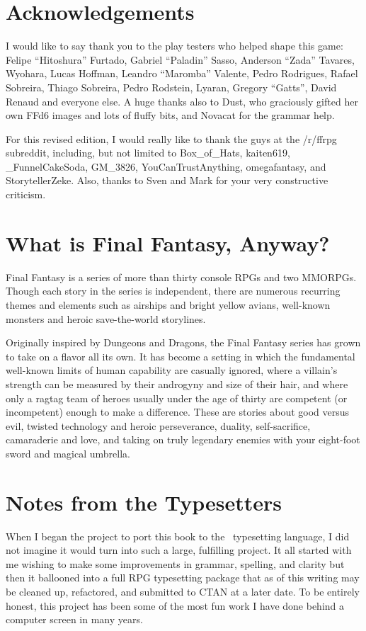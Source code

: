 \begin{multicols}{2}
\section{Acknowledgements}\label{sec:acknowledgements}
I would like to say thank you to the play testers who helped shape this game: Felipe ``Hitoshura'' Furtado, Gabriel ``Paladin'' Sasso, Anderson ``Zada'' Tavares, Wyohara, Lucas Hoffman, Leandro ``Maromba'' Valente, Pedro Rodrigues, Rafael Sobreira, Thiago Sobreira, Pedro Rodstein, Lyaran, Gregory ``Gatts'', David Renaud and everyone else. A huge thanks also to Dust, who graciously gifted her own FFd6 images and lots of fluffy bits, and Novacat for the grammar
help. \pw%

For this revised edition, I would really like to thank the guys at the /r/ffrpg subreddit, including, but not limited to Box\_of\_Hats, kaiten619, \_FunnelCakeSoda, GM\_3826, YouCanTrustAnything, omegafantasy, and StorytellerZeke. Also, thanks to Sven and Mark for your very constructive criticism.

\section{What is Final Fantasy, Anyway?}\label{sec:whatff}
Final Fantasy is a series of more than thirty console RPGs and two MMORPGs. Though each story in the series is independent, there are numerous recurring themes and elements such as airships and bright yellow avians, well-known monsters and heroic save-the-world storylines.

Originally inspired by Dungeons and Dragons, the Final Fantasy series has grown to take on a flavor all its own. It has become a setting in which the fundamental well-known limits of human capability are casually ignored, where a villain’s strength can be measured by their androgyny and size of their hair, and where only a ragtag team of heroes usually under the age of thirty are competent (or incompetent) enough to make a difference. These are stories about good versus evil, twisted technology and heroic perseverance, duality, self-sacrifice, camaraderie and love, and taking on truly legendary enemies with your eight-foot sword and magical umbrella.

\section{Notes from the Typesetters}\label{sec:forward-typesetting}
When I began the project to port this book to the \XeLaTeX\ typesetting language, I did not imagine it would turn into such a large, fulfilling project. It all started with me wishing to make some improvements in grammar, spelling, and clarity but then it ballooned into a full RPG typesetting package that as of this writing may be cleaned up, refactored, and submitted to CTAN at a later date. To be entirely honest, this project has been some of the most fun work I have done behind a computer screen in many years.\pc%


\end{multicols}
